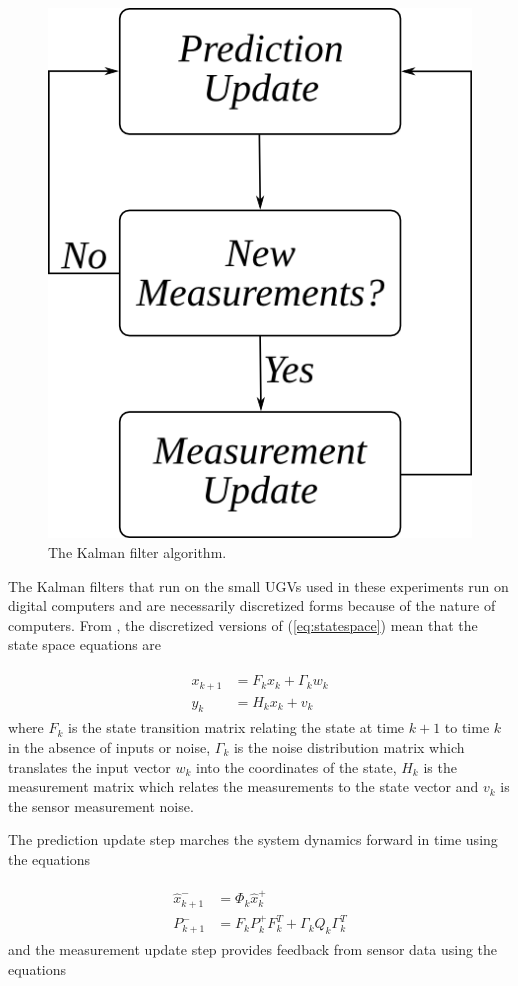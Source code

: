\begin{figure}[ht!]
	\centering
	\includegraphics[width=.4\textwidth]{images/kf}
	\caption{The Kalman filter algorithm.}
	\label{fig:kf}
\end{figure}

The Kalman filters that run on the small UGVs used in these experiments run on digital computers and are necessarily discretized forms because of the nature of computers. From \cite{Kelly_1994_338}, \cite{Simon06OptimalEstimation} the discretized versions of (\ref{eq:statespace}) mean that the state space equations are

\begin{align}
\label{eq:kfstatemodel}
\begin{split}
x_{k+1} &= F_kx_k + \Gamma_kw_k \\
y_k &= H_kx_k + v_k
\end{split}
\end{align}
where $F_k$ is the state transition matrix relating the state at time $k+1$ to time $k$ in the absence of inputs or noise, $\Gamma_k$ is the noise distribution matrix which translates the input vector $w_k$ into the coordinates of the state, $H_k$ is the measurement matrix which relates the measurements to the state vector and $v_k$ is the sensor measurement noise.

The prediction update step marches the system dynamics forward in time using the equations

\begin{align}
\label{eq:kfpredictionupdate}
\begin{split}
\hat{x}_{k+1}^- &= \Phi_k\hat{x}_k^+ \\
P_{k+1}^- &= F_kP_k^+F_k^T + \Gamma_kQ_k\Gamma_k^T
\end{split}
\end{align}
and the measurement update step provides feedback from sensor data using the equations

